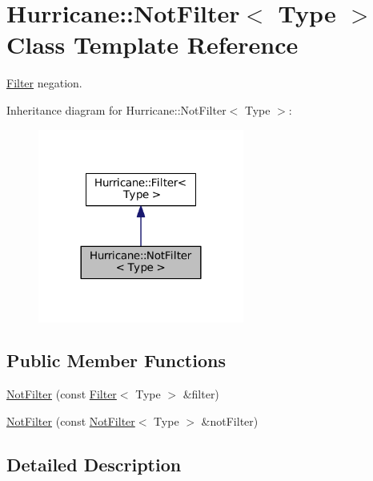 \hypertarget{classHurricane_1_1NotFilter}{}\section{Hurricane\+:\+:Not\+Filter$<$ Type $>$ Class Template Reference}
\label{classHurricane_1_1NotFilter}


\mbox{\hyperlink{classHurricane_1_1Filter}{Filter}} negation.  




Inheritance diagram for Hurricane\+:\+:Not\+Filter$<$ Type $>$\+:\nopagebreak
\begin{figure}[H]
\begin{center}
\leavevmode
\includegraphics[width=192pt]{classHurricane_1_1NotFilter__inherit__graph}
\end{center}
\end{figure}
\subsection*{Public Member Functions}
\begin{DoxyCompactItemize}
\item 
\mbox{\hyperlink{classHurricane_1_1NotFilter_a8c75f2e192929c1b559f4ca876e47126}{Not\+Filter}} (const \mbox{\hyperlink{classHurricane_1_1Filter}{Filter}}$<$ Type $>$ \&filter)
\item 
\mbox{\hyperlink{classHurricane_1_1NotFilter_a232102dc584111a704e66b2ac793af86}{Not\+Filter}} (const \mbox{\hyperlink{classHurricane_1_1NotFilter}{Not\+Filter}}$<$ Type $>$ \&not\+Filter)
\end{DoxyCompactItemize}


\subsection{Detailed Description}
